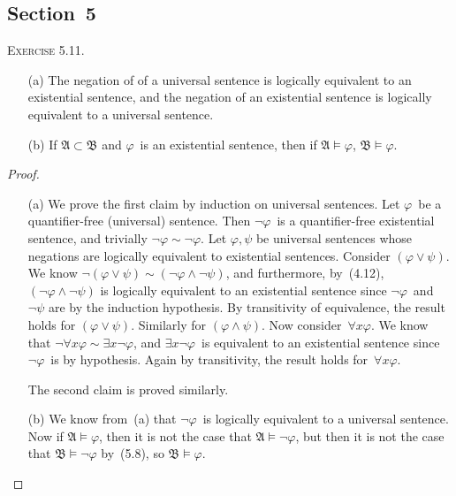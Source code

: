 \documentclass[letterpaper]{article}
\newcommand{\lequiv}{\sim}
\theoremstyle{remark}
\begin{document}
\subsection*{Section~5}
\noindent\textsc{Exercise 5.11.}
\begin{enumerate}
\item[(a)] The negation of of a universal sentence is logically equivalent to an existential sentence, and the negation of an existential sentence is logically equivalent to a universal sentence.
\item[(b)] If $\mathfrak{A}\subset\mathfrak{B}$ and $\varphi$~is an existential sentence, then if $\mathfrak{A}\models\varphi$, $\mathfrak{B}\models\varphi$.
\end{enumerate}
\begin{proof}
\begin{enumerate}
\item[(a)] We prove the first claim by induction on universal sentences. Let $\varphi$~be a quantifier-free (universal) sentence. Then $\lnot\varphi$~is a quantifier-free existential sentence, and trivially $\lnot\varphi\lequiv\lnot\varphi$. Let $\varphi,\psi$ be universal sentences whose negations are logically equivalent to existential sentences. Consider $(\varphi\lor\psi)$. We know $\lnot(\varphi\lor\psi)\lequiv(\lnot\varphi\land\lnot\psi)$, and furthermore, by~(4.12), $(\lnot\varphi\land\lnot\psi)$ is logically equivalent to an existential sentence since $\lnot\varphi$~and~$\lnot\psi$ are by the induction hypothesis. By transitivity of equivalence, the result holds for $(\varphi\lor\psi)$. Similarly for $(\varphi\land\psi)$. Now consider~$\forall x\varphi$. We know that $\lnot\forall x\varphi\lequiv\exists x\lnot\varphi$, and $\exists x\lnot\varphi$~is equivalent to an existential sentence since $\lnot\varphi$~is by hypothesis. Again by transitivity, the result holds for~$\forall x\varphi$.

The second claim is proved similarly.
\item[(b)] We know from~(a) that $\lnot\varphi$~is logically equivalent to a universal sentence. Now if $\mathfrak{A}\models\varphi$, then it is not the case that $\mathfrak{A}\models\lnot\varphi$, but then it is not the case that $\mathfrak{B}\models\lnot\varphi$ by~(5.8), so $\mathfrak{B}\models\varphi$.
\end{enumerate}
\end{proof}
\end{document}
